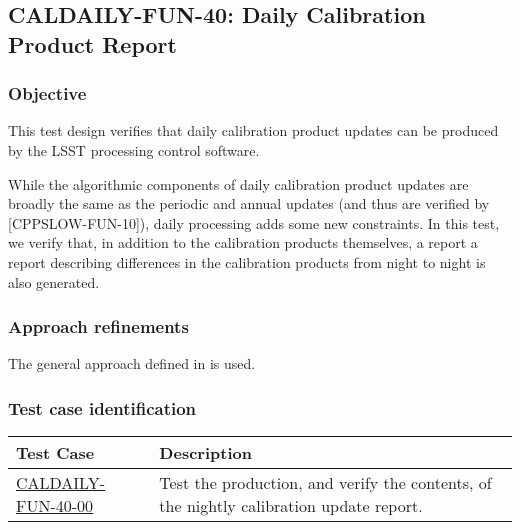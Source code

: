 \subsection{CALDAILY-FUN-40: Daily Calibration Product Report}
\label{caldaily-fun-40}

\subsubsection{Objective}

This test design verifies that daily calibration product updates can be
produced by the LSST processing control software.

While the algorithmic components of daily calibration product updates are
broadly the same as the periodic and annual updates (and thus are verified by
\hyperref[cppslow-fun-10][CPPSLOW-FUN-10]), daily processing adds some new
constraints. In this test, we verify that, in addition to the calibration
products themselves, a report a report describing differences in the
calibration products from night to night is also generated.

\subsubsection{Approach refinements}

The general approach defined in  is used.

\subsubsection{Test case identification}

\begin{longtable} {|p{}|p{}|}\hline
\textbf{Test Case}  & \textbf{Description} \\\hline

\hyperref[caldaily-fun-40-00]{CALDAILY-FUN-40-00} & Test the production, and verify the contents, of the nightly calibration update report. \\\hline
\end{longtable}
